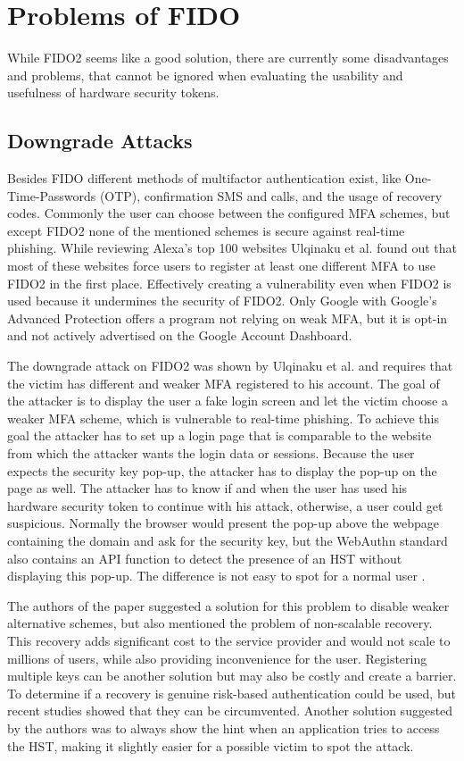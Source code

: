 \documentclass[runningheads]{llncs}
\begin{document}
\section{Problems of FIDO}
While FIDO2 seems like a good solution, there are currently some disadvantages and problems, that cannot be ignored when evaluating the usability and usefulness of hardware security tokens.

\subsection{Downgrade Attacks}
Besides FIDO different methods of multifactor authentication exist, like One-Time-Passwords (OTP), confirmation SMS and calls, and the usage of recovery codes. Commonly the user can choose between the configured MFA schemes, but except FIDO2 none of the mentioned schemes is secure against real-time phishing. While reviewing Alexa's top 100 websites Ulqinaku et al. found out that most of these websites force users to register at least one different MFA to use FIDO2 in the first place. Effectively creating a vulnerability even when FIDO2 is used because it undermines the security of FIDO2. Only Google with Google's Advanced Protection offers a program not relying on weak MFA, but it is opt-in and not actively advertised on the Google Account Dashboard.

The downgrade attack on FIDO2 was shown by Ulqinaku et al. and requires that the victim has different and weaker MFA registered to his account. The goal of the attacker is to display the user a fake login screen and let the victim choose a weaker MFA scheme, which is vulnerable to real-time phishing. To achieve this goal the attacker has to set up a login page that is comparable to the website from which the attacker wants the login data or sessions. Because the user expects the security key pop-up, the attacker has to display the pop-up on the page as well. The attacker has to know if and when the user has used his hardware security token to continue with his attack, otherwise, a user could get suspicious. Normally the browser would present the pop-up above the webpage containing the domain and ask for the security key, but the WebAuthn standard also contains an API function to detect the presence of an HST without displaying this pop-up. The difference is not easy to spot for a normal user \cite{274610}.

The authors of the paper suggested a solution for this problem to disable weaker alternative schemes, but also mentioned the problem of non-scalable recovery. This recovery adds significant cost to the service provider and would not scale to millions of users, while also providing inconvenience for the user. Registering multiple keys can be another solution but may also be costly and create a barrier. To determine if a recovery is genuine risk-based authentication could be used, but recent studies showed that they can be circumvented. Another solution suggested by the authors was to always show the hint when an application tries to access the HST, making it slightly easier for a possible victim to spot the attack.
\end{document}
